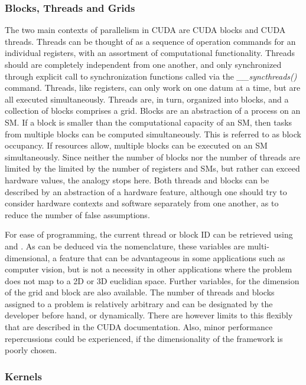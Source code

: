 \subsubsection{Blocks, Threads and Grids}\label{btg}
The two main contexts of parallelism in CUDA are CUDA blocks and CUDA threads.
Threads can be thought of as a sequence of operation commands for an individual registers, with an assortment of computational
functionality.  Threads should are completely independent from one another,
and only synchronized through explicit call to synchronization functions called via the \textit{\_\_syncthreads()} command. Threads, like
registers, can only work on one datum at a time, but are all executed simultaneously.
Threads are, in turn, organized into blocks, and a collection of blocks comprises a grid.
Blocks are an abstraction of a process on an SM.  If a block is smaller than
the computational capacity of an SM, then tasks from multiple blocks can be computed
simultaneously.  This is referred to as block occupancy.  If resources allow, multiple blocks can
be executed on an \Gls{SM} simultaneously. Since neither the number of blocks nor the
number of threads are limited by the limited by the number of registers and \Glspl{SM},
but rather can exceed hardware values, the analogy stops here.  Both
threads and blocks can be described by an abstraction of a hardware feature, although one should try to
consider hardware contexts and software separately from one another, as to reduce the number
of false assumptions.
\par
For ease of programming, the current thread or block ID can be retrieved using
  and . As can be deduced via the nomenclature,
 these variables are multi-dimensional, a feature that can be advantageous in some
 applications such as computer vision, but is not a necessity in other applications
where the problem does not map to a 2D or 3D euclidian space. Further variables,
for the dimension of the grid and block are also available. %
The number of threads and blocks assigned to a problem is relatively arbitrary and can
be designated by the developer before hand, or dynamically.  There are however limits
to this flexibly that are described in the CUDA documentation\cite{bestpractices}.
  Also, minor performance
repercussions could be experienced, if the dimensionality of the framework is poorly
chosen.
\subsubsection{Kernels}

